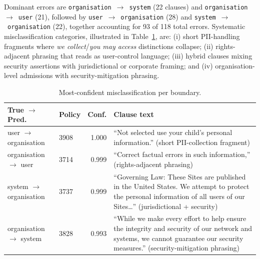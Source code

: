 \documentclass[final,3p,times,twocolumn]{elsarticle}
\begin{document}
	Dominant errors are \texttt{organisation}~$\to$~\texttt{system} (22 clauses)
	and \texttt{organisation}~$\to$~\texttt{user} (21), followed by \texttt{user}~$\to$~\texttt{organisation}
	(28) and \texttt{system}~$\to$~\texttt{organisation} (22), together accounting
	for 93 of 118 total errors. Systematic misclassification categories,
	illustrated in Table~\ref{tab:mistakes}, are: (i) short PII-handling fragments
	where \emph{we collect}/\emph{you may access} distinctions collapse; (ii) rights-adjacent
	phrasing that reads as user-control language; (iii) hybrid clauses mixing
	security assertions with jurisdictional or corporate framing; and (iv) organisation-level
	admissions with security-mitigation phrasing.

	\begin{table}
		[h]
		\centering
		\caption{Most-confident misclassification per boundary.}
		\label{tab:mistakes} \footnotesize
		\setlength{\tabcolsep}{3pt}
		\begin{tabular}{@{}l l r p{}@{}}
			\toprule \textbf{True} $\to$ \textbf{Pred.} & \textbf{Policy} & \textbf{Conf.} & \textbf{Clause text}                                                                                                                                                           \\
			\midrule user $\to$ organisation            & 3908            & 1.000          & ``Not selected use your child's personal information.'' (short PII-collection fragment)                                                                                        \\
			organisation $\to$ user                     & 3714            & 0.999          & ``Correct factual errors in such information,'' (rights-adjacent phrasing)                                                                                                     \\
			system $\to$ organisation                   & 3737            & 0.999          & ``Governing Law: These Sites are published in the United States. We attempt to protect the personal information of all users of our Sites\ldots'' (jurisdictional + security)  \\
			organisation $\to$ system                   & 3828            & 0.993          & ``While we make every effort to help ensure the integrity and security of our network and systems, we cannot guarantee our security measures.'' (security-mitigation phrasing) \\
			\bottomrule
		\end{tabular}
	\end{table}
\end{document}
